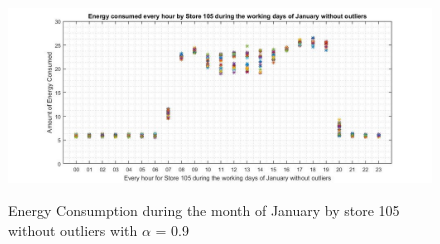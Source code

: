 \documentclass[12pt]{article}
\begin{document}
\begin{figure}[H]
	\centering
	{\includegraphics[scale=0.40]{105_nol_new_last.jpg}\label{7QRX5}
	}
	\caption[Energy Consumption during the month of January by store 105 (same dataset as in Figure \ref{7blockdiag}) without outliers]{Energy Consumption during the month of January by store 105 without outliers with $\alpha$ = 0.9}
	\label{7QRX5}
	\hspace{1cm}%
\end{figure}
\end{document}
